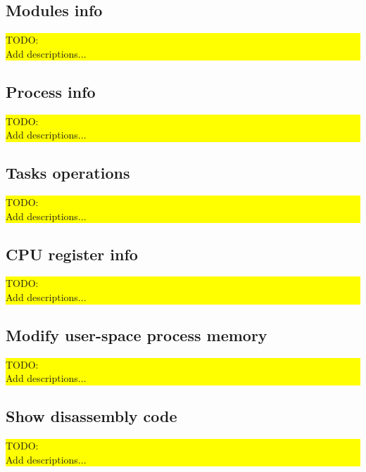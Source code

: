 \documentclass[a4paper,12pt]{article}
\begin{document}
\subsection{Modules info}
\begin{frame}{\bfseries\colorbox{yellow}{\parbox{12cm}{TODO: \\
Add descriptions...}}}\end{frame}

\subsection{Process info}
\begin{frame}{\bfseries\colorbox{yellow}{\parbox{12cm}{TODO: \\
Add descriptions...}}}\end{frame}
\subsection{Tasks operations}
\begin{frame}{\bfseries\colorbox{yellow}{\parbox{12cm}{TODO: \\
Add descriptions...}}}\end{frame}

\subsection{CPU register info}
\begin{frame}{\bfseries\colorbox{yellow}{\parbox{12cm}{TODO: \\
Add descriptions...}}}\end{frame}

\subsection{Modify user-space process memory}
\begin{frame}{\bfseries\colorbox{yellow}{\parbox{12cm}{TODO: \\
Add descriptions...}}}\end{frame}

\subsection{Show disassembly code}
\begin{frame}{\bfseries\colorbox{yellow}{\parbox{12cm}{TODO: \\
Add descriptions...}}}\end{frame}
\end{document}
